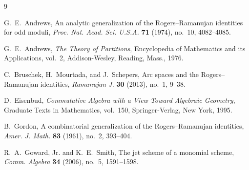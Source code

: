 \documentclass[a4paper, 12pt, reqno]{amsart}
\theoremstyle{remark}
\begin{document}
\begin{thebibliography}{9}

  G.~E.~Andrews,
  \newblock An analytic generalization of the {R}ogers--{R}amanujan identities for odd moduli,
  \newblock \emph{Proc. Nat. Acad. Sci. U.S.A.} \textbf{71} (1974), no.~10, 4082--4085.

  G.~E.~Andrews,
  \newblock \emph{The Theory of Partitions},
  \newblock Encyclopedia of Mathematics and its Applications, vol.~2, Addison-Wesley, Reading, Mass., 1976.

  C.~Bruschek, H.~Mourtada, and J.~Schepers,
  \newblock Arc spaces and the {R}ogers--{R}amanujan identities,
  \newblock \emph{Ramanujan J.} \textbf{30} (2013), no.~1, 9--38.

  D.~Eisenbud,
  \newblock \emph{Commutative Algebra with a View Toward Algebraic Geometry},
  \newblock Graduate Texts in Mathematics, vol.~150, Springer-Verlag, New York, 1995.

  B.~Gordon,
  \newblock A combinatorial generalization of the {R}ogers--{R}amanujan identities,
  \newblock \emph{Amer. J. Math.} \textbf{83} (1961), no.~2, 393--404.

  R.~A.~Goward, Jr. and K.~E.~Smith,
  \newblock The jet scheme of a monomial scheme,
  \newblock \emph{Comm. Algebra} \textbf{34} (2006), no.~5, 1591--1598.

\end{thebibliography}

\printindex
\end{document}
